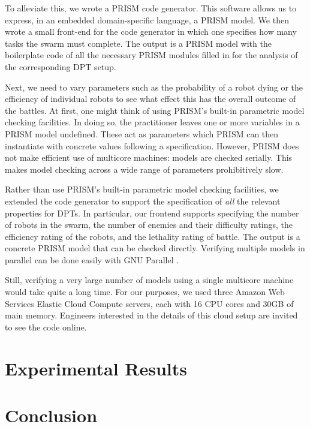 \documentclass[11pt]{article}
\theoremstyle{definition}
\begin{document}
\begin{description}
To alleviate this, we wrote a PRISM code generator.
This software allows us to express, in an embedded domain-specific language, a
PRISM model.
We then wrote a small front-end for the code generator in which one specifies
how many tasks the swarm must complete.
The output is a PRISM model with the boilerplate code of all the necessary
PRISM modules filled in for the analysis of the corresponding DPT setup.

Next, we need to vary parameters such as the probability of a robot dying or
the efficiency of individual robots to see what effect this has the overall
outcome of the battles.
%
At first, one might think of using PRISM's built-in parametric model checking
facilities.
%
In doing so, the practitioner leaves one or more variables in a PRISM model
undefined.
%
These act as parameters which PRISM can then instantiate with concrete values
following a specification.
%
However, PRISM does not make efficient use of multicore machines:
models are checked serially.
This makes model checking across a wide range of parameters prohibitively slow.

Rather than use PRISM's built-in parametric model checking facilities, we
extended the code generator to support the specification of \emph{all} the
relevant properties for DPTs.
%
In particular, our frontend supports specifying the number of robots in the
swarm, the number of enemies and their difficulty ratings, the efficiency
rating of the robots, and the lethality rating of battle.
%
The output is a concrete PRISM model that can be checked directly.
%
Verifying multiple models in parallel can be done easily with GNU Parallel
\cite{parallel}.

Still, verifying a very large number of models using a single multicore machine
would take quite a long time.
For our purposes, we used three Amazon Web Services Elastic Cloud Compute
servers, each with 16 CPU cores and 30GB of main memory.
Engineers interested in the details of this cloud setup are invited to see the
code online\footnotemark.


\section{Experimental Results}
\label{sec:results}

\section{Conclusion}
\label{sec:conclusion}


\end{description}
\end{document}
